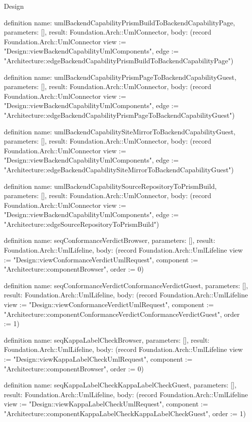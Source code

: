 \begin{lexlean}{Design}
\begin{semanticmodule}
definition{
  name: umlBackendCapabilityPrismBuildToBackendCapabilityPage,
  parameters: [],
  result: Foundation.Arch::UmlConnector,
  body: (record Foundation.Arch::UmlConnector {view := "Design::viewBackendCapabilityUmlComponents", edge := "Architecture::edgeBackendCapabilityPrismBuildToBackendCapabilityPage"})
}

definition{
  name: umlBackendCapabilityPrismPageToBackendCapabilityGuest,
  parameters: [],
  result: Foundation.Arch::UmlConnector,
  body: (record Foundation.Arch::UmlConnector {view := "Design::viewBackendCapabilityUmlComponents", edge := "Architecture::edgeBackendCapabilityPrismPageToBackendCapabilityGuest"})
}

definition{
  name: umlBackendCapabilitySiteMirrorToBackendCapabilityGuest,
  parameters: [],
  result: Foundation.Arch::UmlConnector,
  body: (record Foundation.Arch::UmlConnector {view := "Design::viewBackendCapabilityUmlComponents", edge := "Architecture::edgeBackendCapabilitySiteMirrorToBackendCapabilityGuest"})
}

definition{
  name: umlBackendCapabilitySourceRepositoryToPrismBuild,
  parameters: [],
  result: Foundation.Arch::UmlConnector,
  body: (record Foundation.Arch::UmlConnector {view := "Design::viewBackendCapabilityUmlComponents", edge := "Architecture::edgeSourceRepositoryToPrismBuild"})
}

definition{
  name: seqConformanceVerdictBrowser,
  parameters: [],
  result: Foundation.Arch::UmlLifeline,
  body: (record Foundation.Arch::UmlLifeline {view := "Design::viewConformanceVerdictUmlRequest", component := "Architecture::componentBrowser", order := 0})
}

definition{
  name: seqConformanceVerdictConformanceVerdictGuest,
  parameters: [],
  result: Foundation.Arch::UmlLifeline,
  body: (record Foundation.Arch::UmlLifeline {view := "Design::viewConformanceVerdictUmlRequest", component := "Architecture::componentConformanceVerdictConformanceVerdictGuest", order := 1})
}

definition{
  name: seqKappaLabelCheckBrowser,
  parameters: [],
  result: Foundation.Arch::UmlLifeline,
  body: (record Foundation.Arch::UmlLifeline {view := "Design::viewKappaLabelCheckUmlRequest", component := "Architecture::componentBrowser", order := 0})
}

definition{
  name: seqKappaLabelCheckKappaLabelCheckGuest,
  parameters: [],
  result: Foundation.Arch::UmlLifeline,
  body: (record Foundation.Arch::UmlLifeline {view := "Design::viewKappaLabelCheckUmlRequest", component := "Architecture::componentKappaLabelCheckKappaLabelCheckGuest", order := 1})
}


\end{semanticmodule}
\end{lexlean}
